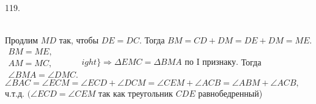 119. \begin{figure}[ht!]
\end{figure}\\
Продлим $MD$ так, чтобы $DE=DC.$ Тогда $BM=CD+DM=DE+DM=ME.$\\ $\left.\begin{array}{l}BM=ME,\\
AM=MC,\\
\angle BMA=\angle DMC. \end{array}
ight\}\Rightarrow \Delta EMC=\Delta BMA\text{ по I признаку.}$ Тогда
$\angle BAC=\angle ECM=\angle ECD+\angle DCM=\angle CEM+\angle ACB=\angle ABM+\angle ACB,$ ч.т.д. $(\angle ECD=\angle CEM$ так как треугольник $CDE$ равнобедренный)\\
